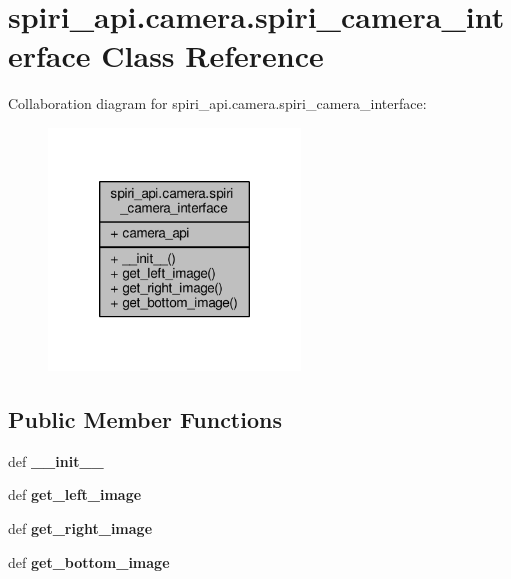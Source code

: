 \hypertarget{classspiri__api_1_1camera_1_1spiri__camera__interface}{\section{spiri\-\_\-api.\-camera.\-spiri\-\_\-camera\-\_\-interface Class Reference}
\label{classspiri__api_1_1camera_1_1spiri__camera__interface}
}


Collaboration diagram for spiri\-\_\-api.\-camera.\-spiri\-\_\-camera\-\_\-interface\-:
\nopagebreak
\begin{figure}[H]
\begin{center}
\leavevmode
\includegraphics[width=190pt]{classspiri__api_1_1camera_1_1spiri__camera__interface__coll__graph}
\end{center}
\end{figure}
\subsection*{Public Member Functions}
\begin{DoxyCompactItemize}
\item 
\hypertarget{classspiri__api_1_1camera_1_1spiri__camera__interface_aee2a6669afe1a1308ce542d5974dda3c}{def {\bfseries \-\_\-\-\_\-init\-\_\-\-\_\-}}\label{classspiri__api_1_1camera_1_1spiri__camera__interface_aee2a6669afe1a1308ce542d5974dda3c}

\item 
\hypertarget{classspiri__api_1_1camera_1_1spiri__camera__interface_a6d5d0a765671d9d22b0ea55d194faefb}{def {\bfseries get\-\_\-left\-\_\-image}}\label{classspiri__api_1_1camera_1_1spiri__camera__interface_a6d5d0a765671d9d22b0ea55d194faefb}

\item 
\hypertarget{classspiri__api_1_1camera_1_1spiri__camera__interface_a322777b5399f5a63a4d250ddbc605122}{def {\bfseries get\-\_\-right\-\_\-image}}\label{classspiri__api_1_1camera_1_1spiri__camera__interface_a322777b5399f5a63a4d250ddbc605122}

\item 
\hypertarget{classspiri__api_1_1camera_1_1spiri__camera__interface_a97e99cc5c45994374ccc0bafd260c402}{def {\bfseries get\-\_\-bottom\-\_\-image}}\label{classspiri__api_1_1camera_1_1spiri__camera__interface_a97e99cc5c45994374ccc0bafd260c402}

\end{DoxyCompactItemize}
